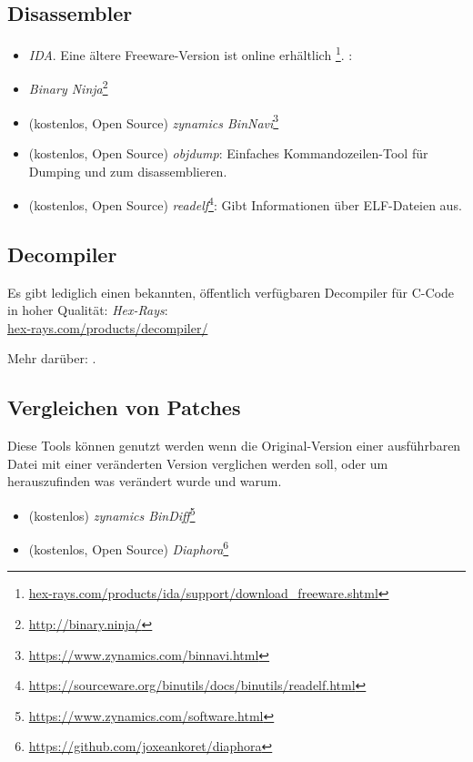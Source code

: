 \subsection{Disassembler}


\begin{itemize}
\item \emph{IDA}. Eine ältere Freeware-Version ist online erhältlich
\footnote{\href{http://go.yurichev.com/17031}{hex-rays.com/products/ida/support/download\_freeware.shtml}}.
\ShortHotKeyCheatsheet: 

\item \emph{Binary Ninja}\footnote{\url{http://binary.ninja/}}

\item (kostenlos, Open Source) \emph{zynamics BinNavi}\footnote{\url{https://www.zynamics.com/binnavi.html}}

\item (kostenlos, Open Source) \emph{objdump}: Einfaches Kommandozeilen-Tool für Dumping und zum disassemblieren.

\item (kostenlos, Open Source) \emph{readelf}\footnote{\url{https://sourceware.org/binutils/docs/binutils/readelf.html}}:
Gibt Informationen über ELF-Dateien aus.
\end{itemize}

\subsection{Decompiler}

Es gibt lediglich einen bekannten, öffentlich verfügbaren Decompiler für C-Code in
hoher Qualität: \emph{Hex-Rays}:\\
\href{http://go.yurichev.com/17033}{hex-rays.com/products/decompiler/}

Mehr darüber: .

\subsection{Vergleichen von Patches}

Diese Tools können genutzt werden wenn die Original-Version einer ausführbaren Datei
mit einer veränderten Version verglichen werden soll, oder um herauszufinden was
verändert wurde und warum.

\begin{itemize}
\item (kostenlos) \emph{zynamics BinDiff}\footnote{\url{https://www.zynamics.com/software.html}}

\item (kostenlos, Open Source) \emph{Diaphora}\footnote{\url{https://github.com/joxeankoret/diaphora}}
\end{itemize}

